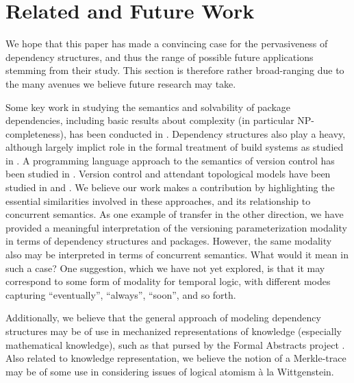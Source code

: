 \documentclass[hoptionsi,review,screen,format=acmsmall]{acmart}
\theoremstyle{definition}
\begin{document}



\section{Related and Future Work}

We hope that this paper has made a convincing case for the pervasiveness of dependency structures, and thus the range of possible future applications stemming from their study. This section is therefore rather broad-ranging due to the many avenues we believe future research may take.

Some key work in studying the semantics and solvability of package dependencies, including basic results about complexity (in particular NP-completeness),  has been conducted in \cite{di2006edos, abate2012dependency}. Dependency structures also play a heavy, although largely implict role in the formal treatment of build systems as studied in \cite{mitchell:shake_24_sep_2018}. A programming language approach to the semantics of version control has been studied in \cite{swierstra2014semantics}. Version control and attendant topological models have been studied in \cite{angiuli2014homotopical} and \cite{mimram2013categorical}. We believe our work makes a contribution by highlighting the essential similarities involved in these approaches, and its relationship to concurrent semantics. As one example of transfer in the other direction, we have provided a meaningful interpretation of the versioning parameterization modality in terms of dependency structures and packages. However, the same modality also may be interpreted in terms of concurrent semantics. What would it mean in such a case? One suggestion, which we have not yet explored, is that it may correspond to some form of modality for temporal logic, with different modes capturing ``eventually'', ``always'', ``soon'', and so forth.

Additionally, we believe that the general approach of modeling dependency structures may be of use in mechanized representations of knowledge (especially mathematical knowledge), such as that pursed by the Formal Abstracts project \cite{fabstract}. Also related to knowledge representation, we believe the notion of a Merkle-trace may be of some use in considering issues of logical atomism à la Wittgenstein.
\end{document}
